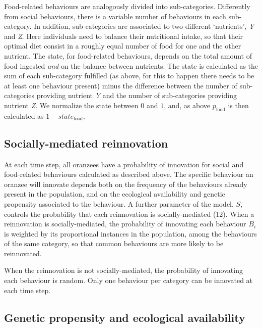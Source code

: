\documentclass[9pt,twocolumn,twoside,]{pnas-new}
\begin{document}
Food-related behaviours are analogously divided into sub-categories.
Differently from social behaviours, there is a variable number of
behaviours in each sub-category. In addition, sub-categories are
associated to two different `nutrients', \emph{Y} and \emph{Z}. Here
individuals need to balance their nutritional intake, so that their
optimal diet consist in a roughly equal number of food for one and the
other nutrient. The state, for food-related behaviours, depends on the
total amount of food ingested \emph{and} on the balance between
nutrients. The state is calculated as the sum of each sub-category
fulfilled (as above, for this to happen there needs to be at least one
behaviour present) minus the difference between the number of
sub-categories providing nutrient \emph{Y} and the number of
sub-categories providing nutrient \emph{Z}. We normalize the state
between \(0\) and \(1\), and, as above \(p_\text{food}\) is then
calculated as \(1-state_\text{food}\).

\subsection*{Socially-mediated reinnovation}\label{format}

At each time step, all oranzees have a probability of innovation for
social and food-related behaviours calculated as described above. The
specific behaviour an oranzee will innovate depends both on the
frequency of the behaviours already present in the population, and on
the ecological availability and genetic propensity associated to the
behaviour. A further parameter of the model, \(S\), controls the
probability that each reinnovation is socially-mediated (12). When a
reinnovation is socially-mediated, the probability of innovating each
behaviour \(B_i\) is weighted by its proportional instances in the
population, among the behaviours of the same category, so that common
behaviours are more likely to be reinnovated.

When the reinnovation is not socially-mediated, the probability of
innovating each behaviour is random. Only one behaviour per category can
be innovated at each time step.

\subsection*{Genetic propensity and ecological
availability}\label{format}
\end{document}
